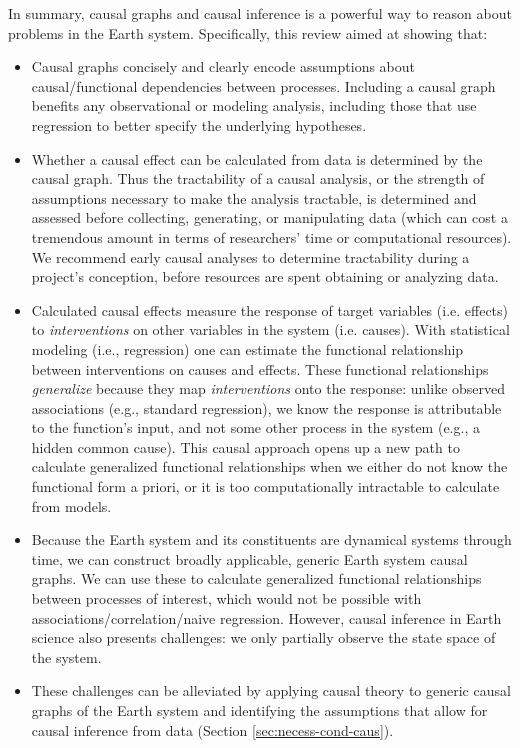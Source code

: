 \documentclass[12pt]{article}
\begin{document}
In summary, causal graphs and causal inference is a powerful way to reason about problems in the Earth system. Specifically, this review aimed at showing that:

\begin{itemize}
\item Causal graphs concisely and clearly encode assumptions about
  causal/functional dependencies between processes. Including a causal
  graph benefits any observational or modeling analysis, including
  those that use regression to better specify the underlying hypotheses.
\item Whether a causal effect can be calculated from data is
  determined by the causal graph. Thus the tractability of a causal
  analysis, or the strength of assumptions necessary to make the
  analysis tractable, is determined and assessed before collecting,
  generating, or manipulating data (which can cost a tremendous amount
  in terms of researchers' time or computational resources). We
  recommend early causal analyses to determine tractability during a
  project's conception, before resources are spent obtaining or
  analyzing data.
\item Calculated causal effects measure the response of target
  variables (i.e. effects) to \textit{interventions} on other
  variables in the system (i.e. causes). With statistical modeling
  (i.e., regression) one can estimate the functional relationship
  between interventions on causes and effects.  These functional
  relationships \textit{generalize} because they map
  \textit{interventions} onto the response: unlike observed
  associations (e.g., standard regression), we know the response is
  attributable to the function's input, and not some other process in
  the system (e.g., a hidden common cause). This causal approach opens
  up a new path to calculate generalized functional relationships when
  we either do not know the functional form a priori, or it is too
  computationally intractable to calculate from models.
\item Because the Earth system and its constituents are dynamical systems through time, we can construct broadly applicable, generic Earth system
  causal graphs. We can use these to calculate generalized functional
  relationships between processes of interest, which would not be
  possible with associations/correlation/naive regression. However,
  causal inference in Earth science also presents challenges: we only
  partially observe the state space of the system.
\item These challenges can be alleviated by applying causal theory to
  generic causal graphs of the Earth system and identifying the
  assumptions that allow for causal inference from data (Section
  \ref{sec:necess-cond-caus}).
\end{itemize}
\end{document}
